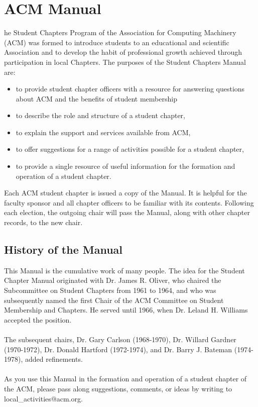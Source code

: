 %
%
\let\textcircled=\pgftextcircled
\chapter{ACM Manual}
\label{chap:manual}

he Student Chapters Program of the Association for Computing Machinery (ACM) was formed to introduce students to an educational and scientific Association and to develop the habit of professional growth achieved through participation in local Chapters. The purposes of the Student Chapters Manual are:
	\begin{itemize}
		\item to provide student chapter officers with a resource for answering 				questions about ACM and the benefits of student membership
      \item to describe the role and structure of a student chapter,
		\item to explain the support and services available from ACM,
		\item to offer suggestions for a range of activities possible for a student 			chapter,
		\item to provide a single resource of useful information for the formation 				and operation of a student chapter.
	\end{itemize}

Each ACM student chapter is issued a copy of the Manual. It is helpful for the faculty sponsor and all chapter officers to be familiar with its contents. Following each election, the outgoing chair will pass the Manual, along with other chapter records, to the new chair.

\section{History of the Manual}
\label{sec:sec01}

This Manual is the cumulative work of many people. The idea for the Student Chapter Manual originated with Dr. James R. Oliver, who chaired the Subcommittee on Student Chapters from 1961 to 1964, and who was subsequently named the first Chair of the ACM Committee on Student Membership and Chapters. He served until 1966, when Dr. Leland H. Williams accepted the position.
\\
\\
The subsequent chairs, Dr. Gary Carlson (1968-1970), Dr. Willard Gardner (1970-1972), Dr. Donald Hartford (1972-1974), and Dr. Barry J. Bateman (1974-1978), added refinements.
\\
\\
As you use this Manual in the formation and operation of a student chapter of the ACM, please pass along suggestions, comments, or ideas by writing to local\_activities@acm.org.

